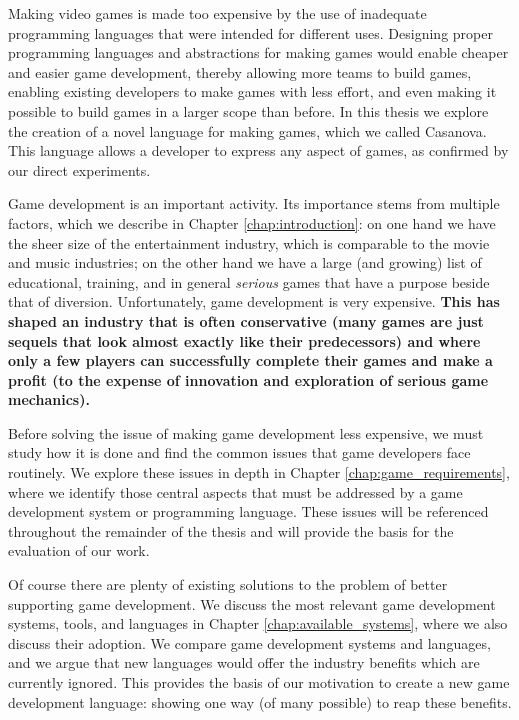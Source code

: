 Making video games is made too expensive by the use of inadequate programming languages that were intended for different uses. Designing proper programming languages and abstractions for making games would enable cheaper and easier game development, thereby allowing more teams to build games, enabling existing developers to make games with less effort, and even making it possible to build games in a larger scope than before. In this thesis we explore the creation of a novel language for making games, which we called Casanova. This language allows a developer to express any aspect of games, as confirmed by our direct experiments.

Game development is an important activity. Its importance stems from multiple factors, which we describe in Chapter \ref{chap:introduction}: on one hand we have the sheer size of the entertainment industry, which is comparable to the movie and music industries; on the other hand we have a large (and growing) list of educational, training, and in general \textit{serious} games that have a purpose beside that of diversion. Unfortunately, game development is very expensive. \textbf{This has shaped an industry that is often conservative (many games are just sequels that look almost exactly like their predecessors) and where only a few players can successfully complete their games and make a profit (to the expense of innovation and exploration of serious game mechanics).}

Before solving the issue of making game development less expensive, we must study how it is done and find the common issues that game developers face routinely. We explore these issues in depth in Chapter \ref{chap:game_requirements}, where we identify those central aspects that must be addressed by a game development system or programming language. These issues will be referenced throughout the remainder of the thesis and will provide the basis for the evaluation of our work.

Of course there are plenty of existing solutions to the problem of better supporting game development. We discuss the most relevant game development systems, tools, and languages in Chapter \ref{chap:available_systems}, where we also discuss their adoption. We compare game development systems and languages, and we argue that new languages would offer the industry benefits which are currently ignored. This provides the basis of our motivation to create a new game development language: showing one way (of many possible) to reap these benefits.

